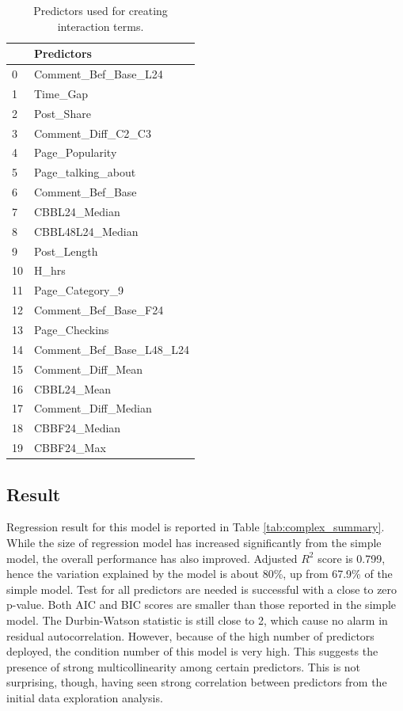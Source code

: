 \documentclass[]{article}
\begin{document}
\begin{table}
\begin{center}
\begin{tabular}{ll}
	\toprule
	{} &                Predictors \\
	\midrule
	0  &      Comment\_Bef\_Base\_L24 \\
	1  &                  Time\_Gap \\
	2  &                Post\_Share \\
	3  &        Comment\_Diff\_C2\_C3 \\
	4  &           Page\_Popularity \\
	5  &        Page\_talking\_about \\
	6  &          Comment\_Bef\_Base \\
	7  &             CBBL24\_Median \\
	8  &          CBBL48L24\_Median \\
	9  &               Post\_Length \\
	10 &                     H\_hrs \\
	11 &           Page\_Category\_9 \\
	12 &      Comment\_Bef\_Base\_F24 \\
	13 &             Page\_Checkins \\
	14 &  Comment\_Bef\_Base\_L48\_L24 \\
	15 &         Comment\_Diff\_Mean \\
	16 &               CBBL24\_Mean \\
	17 &       Comment\_Diff\_Median \\
	18 &             CBBF24\_Median \\
	19 &                CBBF24\_Max \\
	\bottomrule
\end{tabular}
\end{center}
\caption{Predictors used for creating interaction terms.}
\label{tab:complex_predictors}
\end{table}
%

\subsection{Result}
Regression result for this model is reported in Table \ref{tab:complex_summary}. While the size of regression model has increased significantly from the simple model, the overall performance has also improved. Adjusted $R^2$ score is 0.799, hence the variation explained by the model is about 80\%, up from 67.9\% of the simple model. Test for all predictors are needed is successful with a close to zero p-value. Both AIC and BIC scores are smaller than those reported in the simple model. The Durbin-Watson statistic is still close to 2, which cause no alarm in residual autocorrelation. However, because of the high number of predictors deployed, the condition number of this model is very high. This suggests the presence of strong multicollinearity among certain predictors. This is not surprising, though, having seen strong correlation between predictors from the initial data exploration analysis. 
\end{document}

